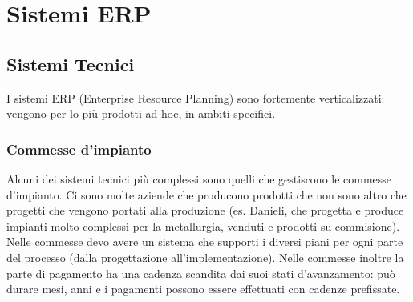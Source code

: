 \chapter{Sistemi ERP}
\label{chap:Sistemi ERP}
\section{Sistemi Tecnici}
\label{sec:Sistemi Tecnici}

I sistemi ERP (Enterprise Resource Planning) sono fortemente verticalizzati: vengono
per lo pi\`u prodotti ad hoc, in ambiti specifici.
\subsection{Commesse d'impianto}
\label{sub:Commesse d'impianto}
Alcuni dei sistemi tecnici pi\`u complessi sono quelli che gestiscono
le commesse d'impianto. Ci sono molte aziende che producono prodotti che
non sono altro che progetti che vengono portati alla produzione (es. Danieli,
che progetta e produce impianti molto complessi per la metallurgia, venduti e
prodotti su commisione).\\
Nelle commesse devo avere un sistema che supporti i diversi piani
per ogni parte del processo (dalla progettazione all'implementazione).
Nelle commesse inoltre la parte di pagamento ha una cadenza scandita dai suoi stati
d'avanzamento: pu\`o durare mesi, anni e i pagamenti possono essere
effettuati con cadenze prefissate.\\
